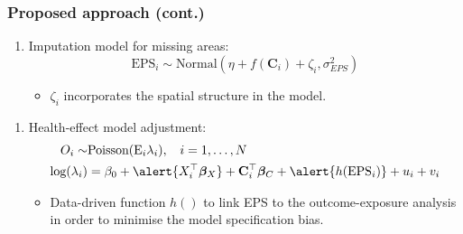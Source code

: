 \documentclass[slidestop,compress,serif,10pt]{beamer}
\begin{document}
\begin{frame}
\frametitle{Proposed approach (cont.)}
 \begin{enumerate}[{(3)}]
\vfill \item Imputation model for missing areas:
\begin{equation*}
\text{EPS}_{i} \sim \text{Normal}(\eta + f(\boldsymbol{C}_i)+ \zeta_{i}, \sigma_{EPS}^2)
\end{equation*}
\begin{itemize}
\vfill \item $\zeta_{i}$ incorporates the spatial structure in the model.
\end{itemize}
\end{enumerate}

\pause\begin{enumerate}[{(4)}]
\item \vfill Health-effect model adjustment:\\
\begin{equation*}
\begin{split}
O_{i}\sim & \text{Poisson}(\text{E}_{i} \lambda_{i}), \hspace{9pt} i=1,\dots, N \\
\text{log}(\lambda_i) & = \beta_0 + \alert{X_{i}^\top \boldsymbol{\beta}_X} + \mathbf{C}_{i}^\top \boldsymbol{\beta}_C + \alert{h(\text{EPS}_i)} + u_{i} + v_{i}
\end{split}
\end{equation*}

\begin{itemize}
\vfill \item Data-driven function $h()$ to link EPS to the outcome-exposure analysis in order to minimise the model specification bias.
\end{itemize}
\end{enumerate}
\end{frame}
\end{document}
